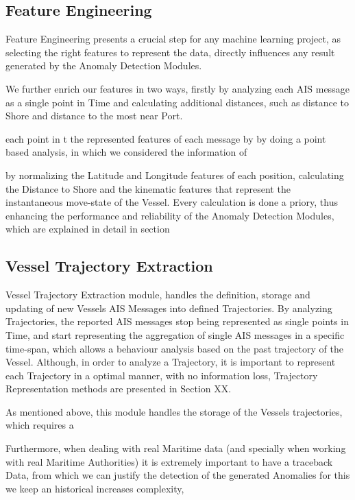 

\subsection{Feature Engineering}
Feature Engineering presents a crucial step for any machine learning project, as selecting the right features to represent the data, directly influences any result generated by the Anomaly Detection Modules.  




We further enrich our features in two ways, firstly by analyzing each AIS message as a single point in Time and calculating additional distances, such as distance to Shore and distance to the most near Port.

each point in t the represented features of each message by by doing a point based analysis, in which we considered the information of  

by normalizing the Latitude and Longitude features of each position, calculating the Distance to Shore and the kinematic features that represent the instantaneous move-state of the Vessel. Every calculation is done a priory, thus enhancing the performance and reliability of the Anomaly Detection Modules, which are explained in detail in section 

\subsection{Vessel Trajectory Extraction}
Vessel Trajectory Extraction module, handles the definition, storage and updating of new Vessels AIS Messages into defined Trajectories.
By analyzing Trajectories, the reported AIS messages stop being represented as single points in Time, and start representing the aggregation of single AIS messages in a specific time-span, which allows a behaviour analysis based on the past trajectory of the Vessel. Although, in order to analyze a Trajectory, it is important to represent each Trajectory in a optimal manner, with no information loss, Trajectory Representation methods are presented in Section XX.  

As mentioned above, this module handles the storage of the Vessels trajectories, which requires a  

Furthermore, when dealing with real Maritime data (and specially when working with real Maritime Authorities) it is extremely important to have a traceback Data, from which we can justify the detection of the generated Anomalies for this we keep an historical 
increases complexity, 


